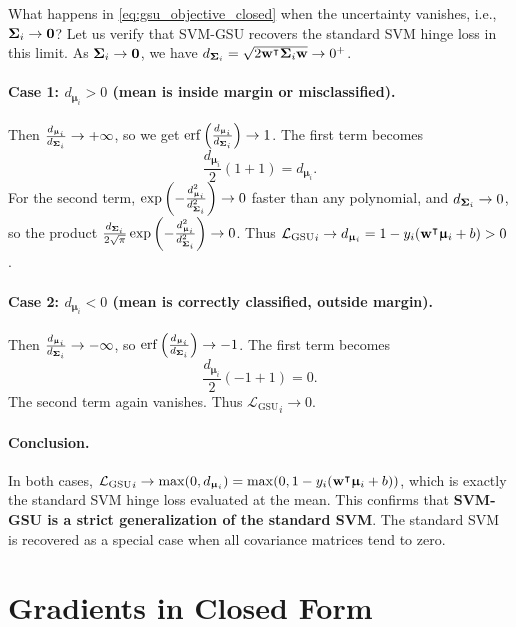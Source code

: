\documentclass[11pt, letterpaper]{article}
\newcommand{\bSigma}{\vb{\Sigma}}
\newcommand{\bmu}{\boldsymbol{\upmu}}
\newcommand{\loss}{\mathcal{L}}
\begin{document}
What happens in \cref{eq:gsu_objective_closed} when the uncertainty vanishes, i.e., $\bSigma_i \to \vb{0}$? Let us verify that SVM-GSU recovers the standard SVM hinge loss in this limit. As $\bSigma_i \to \vb{0}$, we have $d_{\bSigma_i} = \sqrt{2\vb{w}^{\intercal}\bSigma_i\vb{w}} \to 0^+$.

\paragraph{Case 1: $d_{\bmu_i} > 0$ (mean is inside margin or misclassified).} Then $\frac{d_{\bmu_i}}{d_{\bSigma_i}} \to +\infty$, so we get $\mathrm{erf}\left(\frac{d_{\bmu_i}}{d_{\bSigma_i}}\right) \to 1$. The first term becomes
\begin{equation}
    \frac{d_{\bmu_i}}{2}(1 + 1) = d_{\bmu_i}.
\end{equation}
For the second term, $\exp\left(-\frac{d_{\bmu_i}^2}{d_{\bSigma_i}^2}\right) \to 0$ faster than any polynomial, and $d_{\bSigma_i} \to 0$, so the product $\frac{d_{\bSigma_i}}{2\sqrt{\pi}}\exp\left(-\frac{d_{\bmu_i}^2}{d_{\bSigma_i}^2}\right) \to 0$. Thus ${\loss_{\text{GSU}}}_i \to d_{\bmu_i} = 1 - y_i(\vb{w}^{\intercal}\bmu_i + b) > 0$.

\paragraph{Case 2: $d_{\bmu_i} < 0$ (mean is correctly classified, outside margin).} Then $\frac{d_{\bmu_i}}{d_{\bSigma_i}} \to -\infty$, so $\mathrm{erf}\left(\frac{d_{\bmu_i}}{d_{\bSigma_i}}\right) \to -1$. The first term becomes
\begin{equation}
    \frac{d_{\bmu_i}}{2}(-1 + 1) = 0.
\end{equation}
The second term again vanishes. Thus ${\loss_{\text{GSU}}}_i \to 0$.

\paragraph{Conclusion.} In both cases, ${\loss_{\text{GSU}}}_i \to \max(0, d_{\bmu_i}) = \max(0, 1 - y_i(\vb{w}^{\intercal}\bmu_i + b))$, which is exactly the standard SVM hinge loss evaluated at the mean. This confirms that \textbf{SVM-GSU is a strict generalization of the standard SVM}. The standard SVM is recovered as a special case when all covariance matrices tend to zero.

\section{Gradients in Closed Form}\label{sec:gsu_gradients}
\end{document}
